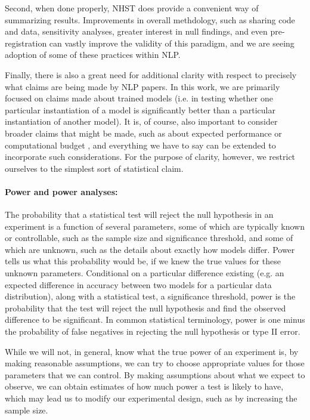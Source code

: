 \documentclass[11pt,a4paper]{article}
\begin{document}
Second, when done properly, NHST does provide a convenient way of summarizing results.
Improvements in overall methdology, such as sharing code and data, sensitivity analyses, greater interest in null findings, and even pre-registration can vastly improve the validity of this paradigm, and we are seeing adoption of some of these practices within NLP. 

Finally, there is also a great need for additional clarity with respect to precisely what claims are being made by NLP papers. 
In this work, we are primarily focused on claims made about trained models (i.e. in testing whether one particular instantiation of a model is significantly better than a particular instantiation of another model). It is, of course, also important to consider broader claims that might be made, such as about expected performance or computational budget \citep{dodge.2019,schwartz.2019}, and everything we have to say can be extended to incorporate such considerations. For the purpose of clarity, however, we restrict ourselves to the simplest sort of statistical claim.

\paragraph{Power and power analyses:}
The probability that a statistical test will reject the null hypothesis in an experiment is a function of several parameters, some of which are typically known or controllable, such as the sample size and significance threshold, and some of which are unknown, such as the details about exactly how models differ. Power tells us what this probability would be, if we knew the true values for these unknown parameters. 
Conditional on a particular difference existing (e.g. an expected difference in accuracy between two models for a particular data distribution), along with a statistical test, a significance threshold, power is the probability that the test will reject the null hypothesis and find the observed difference to be significant. In common statistical terminology, power is one minus the probability of false negatives in rejecting the null hypothesis or type II error.

While we will not, in general, know what the true power of an experiment is, by making reasonable assumptions, we can try to choose appropriate values for those parameters that we can control. By making assumptions about what we expect to observe, we can obtain estimates of how much power a test is likely to have, which may lead us to modify our experimental design, such as by increasing the sample size.
\end{document}
